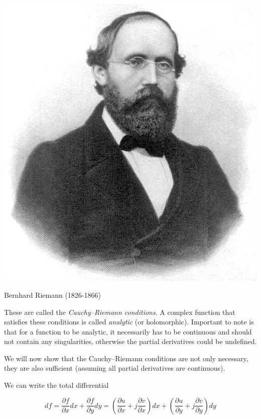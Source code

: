 \begin{marginfigure}[-6.5cm]
  \includegraphics{complex/figures/b_riemann}
  \caption{Bernhard Riemann (1826-1866)}
\end{marginfigure}

These are called the \emph{Cauchy--Riemann conditions}. A complex function that satisfies these conditions is called \emph{analytic} (or holomorphic). Important to note is that for a function to be analytic, it necessarily has to be continuous and should not contain any singularities, otherwise the partial derivatives could be undefined.


We will now show that the Cauchy--Riemann conditions are not only necessary, they are also sufficient (assuming all partial derivatives are continuous).

We can write the total differential

\begin{equation}
d f = \frac{\partial f}{\partial x} d x + \frac{\partial f}{\partial y} d y  = \left( \frac{\partial u}{\partial x}+j\frac{\partial v}{\partial x}\right) d x+\left(\frac{\partial u}{\partial y}+j\frac{\partial v}{\partial y}\right) d y
\end{equation} 

